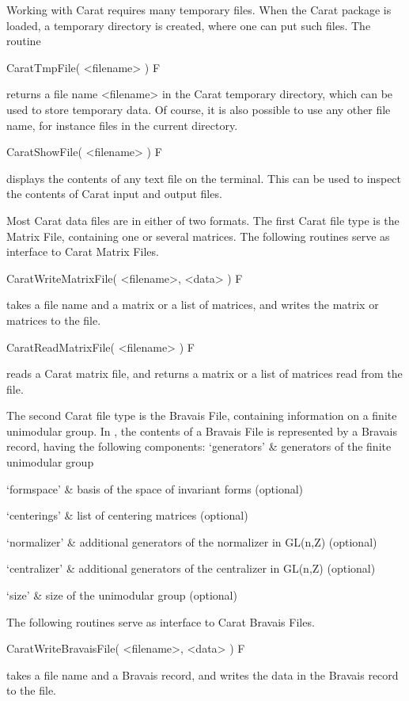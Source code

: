 Working with Carat requires many temporary files. When the Carat
package is loaded, a temporary directory is created, where one can
put such files. The routine

\>CaratTmpFile( <filename> ) F

returns a file name <filename> in the Carat temporary directory, which
can be used to store temporary data. Of course, it is also possible
to use any other file name, for instance files in the current directory.

\>CaratShowFile( <filename> ) F

displays the contents of any text file on the terminal. This can be
used to inspect the contents of Carat input and output files.

Most Carat data files are in either of two formats. The first Carat
file type is the Matrix File, containing one or several matrices.
The following routines serve as interface to Carat Matrix Files.

\>CaratWriteMatrixFile( <filename>, <data> ) F

takes a file name and a matrix or a list of matrices, and writes the
matrix or matrices to the file.

\>CaratReadMatrixFile( <filename> ) F

reads a Carat matrix file, and returns a matrix or a list of matrices
read from the file.

The second Carat file type is the Bravais File, containing information
on a finite unimodular group. In { \GAP}, the contents of a Bravais File 
is represented by a Bravais record, having the following components:
\beginitems
`generators'   & generators of the finite unimodular group

`formspace'    & basis of the space of invariant forms (optional)

`centerings'   & list of centering matrices (optional)

`normalizer'   & additional generators of the normalizer in GL(n,Z) (optional)

`centralizer'  & additional generators of the centralizer in GL(n,Z) (optional)

`size'         & size of the unimodular group (optional)
\enditems

The following routines serve as interface to Carat Bravais Files.

\>CaratWriteBravaisFile( <filename>, <data> ) F

takes a file name and a Bravais record, and writes the data in the
Bravais record to the file.

